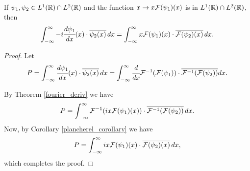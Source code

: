 \documentclass[main.tex]{subfiles}
\begin{document}
\begin{theorem}
If $\psi_1, \psi_2\in L^1(\mathbb{R}) \cap L^2(\mathbb{R})$ and the function $x\to x\mathcal{F}(\psi_1)(x)$ is in $L^{1}(\mathbb{R})\cap L^{2}(\mathbb{R})$, then
\begin{equation}
    \int_{-\infty}^{\infty} -i\cfrac{d\psi_1}{dx}(x) \cdot \overline{\psi_2(x)} \,dx = \int_{-\infty}^{\infty} x\mathcal{F}(\psi_1)(x) \cdot \overline{\mathcal{F}(\psi_2)(x)}\, dx.
\end{equation}
\end{theorem}
\begin{proof}
Let
\begin{equation}
     P = \int_{-\infty}^{\infty} \cfrac{d\psi_1}{dx}(x) \cdot \overline{\psi_2(x)} \,dx =
     \int_{-\infty}^{\infty} \cfrac{d}{d x}\mathcal{F}^{-1}(\mathcal{F}(\psi_1))\cdot \overline{\mathcal{F}^{-1}(\mathcal{F}(\psi_2))} dx.
\end{equation}

By Theorem \ref{fourier_deriv} we have
\begin{equation}
    P = \int_{-\infty}^{\infty} \mathcal{F}^{-1}(ix\mathcal{F}(\psi_1)(x))\cdot \overline{\mathcal{F}^{-1}(\mathcal{F}(\psi_2))}\, dx.
\end{equation}
Now, by Corollary \ref{plancherel_corollary} we have
\begin{equation}
    P = \int_{-\infty}^{\infty} ix\mathcal{F}(\psi_1)(x) \cdot \overline{\mathcal{F}(\psi_2)(x)}\,dx,
\end{equation}
which completes the proof.
\end{proof}
\end{document}
